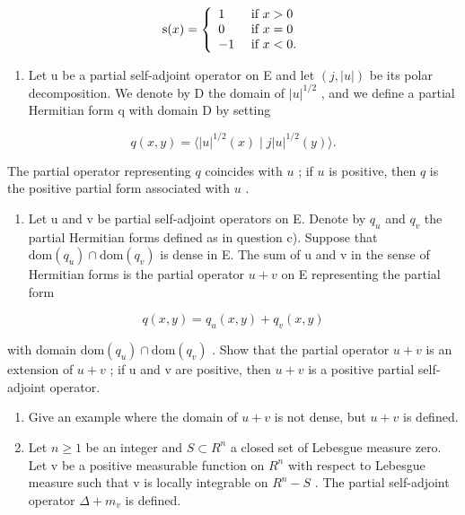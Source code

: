 \[
\mathrm{s} (x) = \left\{ \begin{array}{l l} 1 & \text { if } x > 0 \\ 0 & \text { if } x = 0 \\ - 1 & \text { if } x <   0. \end{array} \right.
\]

\begin{enumerate}
\def\labelenumi{\alph{enumi})}
\setcounter{enumi}{2}
\tightlist
\item
  Let u be a partial self-adjoint operator on E and let \((j, |u|)\) be its polar decomposition. We denote by D the domain of \(|u|^{1/2}\) , and we define a partial Hermitian form q with domain D by setting
\end{enumerate}

\[
q (x, y) = \langle | u | ^ {1 / 2} (x) \mid j | u | ^ {1 / 2} (y) \rangle .
\]

The partial operator representing \(q\) coincides with \(u\) ; if \(u\) is positive, then \(q\) is the positive partial form associated with \(u\) .

\begin{enumerate}
\def\labelenumi{\alph{enumi})}
\setcounter{enumi}{3}
\tightlist
\item
  Let u and v be partial self-adjoint operators on E. Denote by \(q_{u}\) and \(q_{v}\) the partial Hermitian forms defined as in question c). Suppose that \(\text{dom}(q_{u}) \cap \text{dom}(q_{v})\) is dense in E. The sum of u and v in the sense of Hermitian forms is the partial operator \(u + v\) on E representing the partial form
\end{enumerate}

\[
q (x, y) = q _ {u} (x, y) + q _ {v} (x, y)
\]

with domain \(\mathrm{dom}(q_{u})\cap\mathrm{dom}(q_{v})\) . Show that the partial operator \(u+v\) is an extension of \(u+v\) ; if u and v are positive, then \(u+v\) is a positive partial self-adjoint operator.

\begin{enumerate}
\def\labelenumi{\alph{enumi})}
\setcounter{enumi}{4}
\item
  Give an example where the domain of \(u + v\) is not dense, but \(u + v\) is defined.
\item
  Let \(n \geqslant 1\) be an integer and \(S \subset R^{n}\) a closed set of Lebesgue measure zero. Let v be a positive measurable function on \(R^{n}\) with respect to Lebesgue measure such that v is locally integrable on \(R^{n}-S\) . The partial self-adjoint operator \(\Delta + m_{v}\) is defined.
\end{enumerate}


